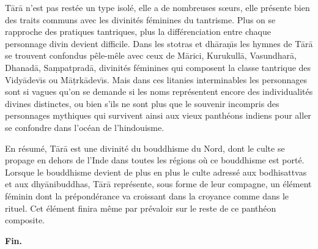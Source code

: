\documentclass[a4paper, 11pt, oneside, french, landscape, twocolumn]{article}
\begin{document}
T\={a}r\={a} n'est pas restée un type isolé, elle a de nombreuses sœurs, elle présente bien des traits communs avec les divinités féminines du tantrisme. Plus on se rapproche des pratiques tantriques, plus la différenciation entre chaque personnage divin devient difficile. Dans les stotras et dh\={a}ra\d{n}\={\i}s les hymnes de T\={a}r\={a} se trouvent confondus pêle-mêle avec ceux de M\={a}rici, Kurukull\={a}, Vasundhar\={a}, Dhanad\={a}, Sa\d{m}patprad\={a}, divinités féminines qui composent la classe tantrique des Vidy\={a}dev\={\i}s ou M\={a}\d{t}rk\={a}dev\={\i}s. Mais dans ces litanies interminables les personnages sont si vagues qu'on se demande si les noms représentent encore des individualités divines distinctes, ou bien s'ils ne sont plus que le souvenir incompris des personnages mythiques qui survivent ainsi aux vieux panthéons indiens pour aller se confondre dans l'océan de l'hindouisme.

En résumé, T\={a}r\={a} est une divinité du bouddhisme du Nord, dont le culte se propage en dehors de l'Inde dans toutes les régions où ce bouddhisme est porté. Lorsque le bouddhisme devient de plus en plus le culte adressé aux bodhisattvas et aux dhy\={a}nibuddhas, T\={a}r\={a} représente, sous forme de leur compagne, un élément féminin dont la prépondérance va croissant dans la croyance comme dans le rituel. Cet élément finira même par prévaloir sur le reste de ce panthéon composite.
\begin{center}
\textbf{Fin.}
\end{center}
\end{document}
